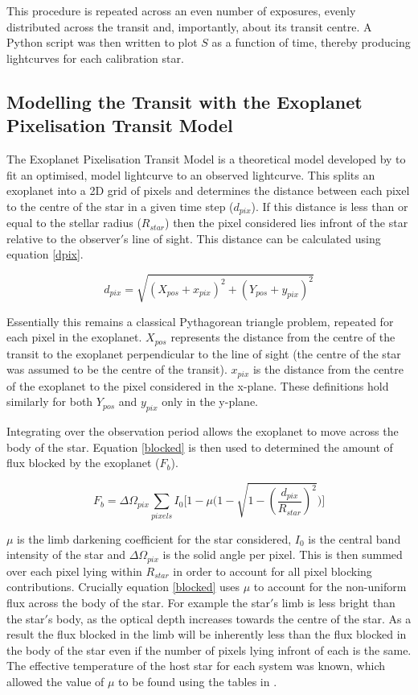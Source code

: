 \documentclass{report}
\begin{document}
This procedure is repeated across an even number of exposures, evenly distributed across the transit and, importantly, about its transit centre. A Python script was then written to plot $S$ as a function of time, thereby producing lightcurves for each calibration star.

\subsection{Modelling the Transit with the Exoplanet Pixelisation Transit Model}
The Exoplanet Pixelisation Transit Model is a theoretical model developed by \textcite{model} to fit an optimised, model lightcurve to an observed lightcurve. This splits an exoplanet into a 2D grid of pixels and determines the distance between each pixel to the centre of the star in a given time step ($d_{pix}$). If this distance is less than or equal to the stellar radius ($R_{star}$) then the pixel considered lies infront of the star relative to the observer$'$s line of sight. This distance can be calculated using equation \ref{dpix}.

\begin{equation} \label{dpix}
    d_{pix} = \sqrt{(X_{pos} + x_{pix})^2 + (Y_{pos} + y_{pix})^2}
\end{equation}

Essentially this remains a classical Pythagorean triangle problem, repeated for each pixel in the exoplanet. $X_{pos}$ represents the distance from the centre of the transit to the exoplanet perpendicular to the line of sight (the centre of the star was assumed to be the centre of the transit). $x_{pix}$ is the distance from the centre of the exoplanet to the pixel considered in the x-plane. These definitions hold similarly for both $Y_{pos}$ and $y_{pix}$ only in the y-plane.

Integrating over the observation period allows the exoplanet to move across the body of the star. Equation \ref{blocked} is then used to determined the amount of flux blocked by the exoplanet ($F_{b}$). 

\begin{equation} \label{blocked}
    F_{b} = \Delta \Omega_{pix} \sum_{pixels} I_{0}\Bigg[1-\mu\Bigg(1-\sqrt{1-\left(\frac{d_{pix}}{R_{star}}\right)^{2}}\Bigg)\Bigg]
\end{equation}

$\mu$ is the limb darkening coefficient for the star considered, $I_{0}$ is the central band intensity of the star and $\Delta\Omega_{pix}$ is the solid angle per pixel. This is then summed over each pixel lying within $R_{star}$ in order to account for all pixel blocking contributions. Crucially equation \ref{blocked} uses $\mu$ to account for the non-uniform flux across the body of the star. For example the star$'$s limb is less bright than the star$'$s body, as the optical depth increases towards the centre of the star. As a result the flux blocked in the limb will be inherently less than the flux blocked in the body of the star even if the number of pixels lying infront of each is the same. The effective temperature of the host star for each system was known, which allowed the value of $\mu$ to be found using the tables in \textcite{vanhamme}.
\end{document}
